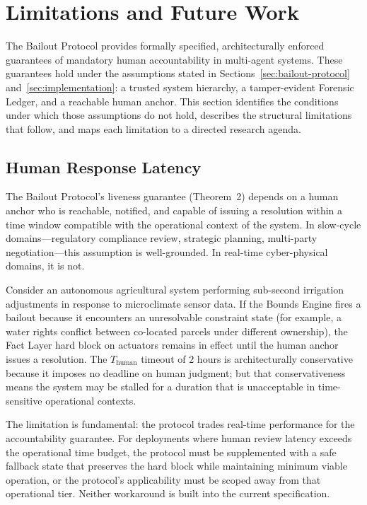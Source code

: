 \section{Limitations and Future Work}
\label{sec:limitations}

The Bailout Protocol provides formally specified, architecturally enforced guarantees of mandatory human accountability in multi-agent systems. These guarantees hold under the assumptions stated in Sections~\ref{sec:bailout-protocol} and~\ref{sec:implementation}: a trusted system hierarchy, a tamper-evident Forensic Ledger, and a reachable human anchor. This section identifies the conditions under which those assumptions do not hold, describes the structural limitations that follow, and maps each limitation to a directed research agenda.

\subsection{Human Response Latency}
\label{sec:human-latency}

The Bailout Protocol's liveness guarantee (Theorem~2) depends on a human anchor who is reachable, notified, and capable of issuing a resolution within a time window compatible with the operational context of the system. In slow-cycle domains---regulatory compliance review, strategic planning, multi-party negotiation---this assumption is well-grounded. In real-time cyber-physical domains, it is not.

Consider an autonomous agricultural system performing sub-second irrigation adjustments in response to microclimate sensor data. If the Bounds Engine fires a bailout because it encounters an unresolvable constraint state (for example, a water rights conflict between co-located parcels under different ownership), the Fact Layer hard block on actuators remains in effect until the human anchor issues a resolution. The $T_{\text{human}}$ timeout of 2 hours is architecturally conservative because it imposes no deadline on human judgment; but that conservativeness means the system may be stalled for a duration that is unacceptable in time-sensitive operational contexts.

The limitation is fundamental: the protocol trades real-time performance for the accountability guarantee. For deployments where human review latency exceeds the operational time budget, the protocol must be supplemented with a safe fallback state that preserves the hard block while maintaining minimum viable operation, or the protocol's applicability must be scoped away from that operational tier. Neither workaround is built into the current specification.

